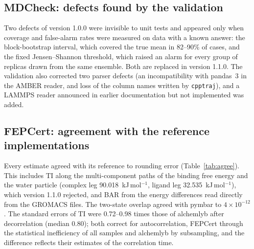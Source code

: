 \documentclass[9pt,lessons]{livecoms}
\newcommand{\tabdir}{tables}
\begin{document}
\begin{table}[t]
\centering\small
\caption{Alarm rates of replica-consistency criteria for random triples of replicas (400 per entry), without and with a shift of one replica by 3 or 6 of its standard errors (SE). The villin replicas are not converged at 2~ns, so alarms without an injected shift are correct detections, not false alarms.}
\label{tab:rep}
\resizebox{\textwidth}{!}{}
\end{table}

\subsection{MDCheck: defects found by the validation}
Two defects of version 1.0.0 were invisible to unit tests and appeared only when coverage and false-alarm rates were measured on data with a known answer: the block-bootstrap interval, which covered the true mean in 82--90\% of cases, and the fixed Jensen--Shannon threshold, which raised an alarm for every group of replicas drawn from the same ensemble. Both are replaced in version 1.1.0. The validation also corrected two parser defects (an incompatibility with pandas~3 in the AMBER reader, and loss of the column names written by \texttt{cpptraj}), and a LAMMPS reader announced in earlier documentation but not implemented was added.

\subsection{FEPCert: agreement with the reference implementations}
Every estimate agreed with its reference to rounding error (Table~\ref{tab:agree}). This includes TI along the multi-component paths of the binding free energy and the water particle (complex leg 90.018~kJ\,mol$^{-1}$, ligand leg 32.535~kJ\,mol$^{-1}$), which version 1.1.0 rejected, and BAR from the energy differences read directly from the GROMACS files. The two-state overlap agreed with pymbar to $4\times10^{-12}$. The standard errors of TI were 0.72--0.98 times those of alchemlyb after decorrelation (median 0.80); both correct for autocorrelation, FEPCert through the statistical inefficiency of all samples and alchemlyb by subsampling, and the difference reflects their estimates of the correlation time.

\begin{table}[t]
\centering\small
\caption{Agreement of FEPCert 1.2 with independent implementations.}
\label{tab:agree}
\resizebox{\textwidth}{!}{}
\end{table}
\end{document}
